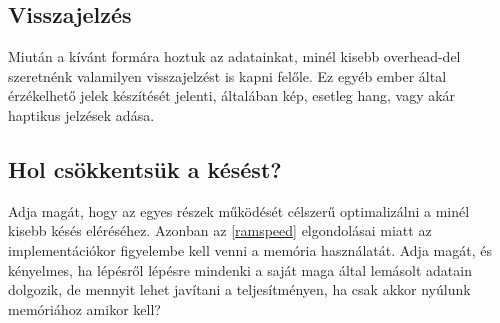 \subsection{Visszajelz\'es}
Miut\'an a k\'iv\'ant form\'ara hoztuk az adatainkat, min\'el kisebb overhead-del szeretn\'enk valamilyen visszajelz\'est is kapni fel\H ole. 
Ez egy\'eb ember \'altal \'erz\'ekelhet\H o jelek k\'esz\'it\'es\'et jelenti, \'altal\'aban k\'ep, esetleg hang, vagy ak\'ar haptikus jelz\'esek ad\'asa.
 
\subsection{Hol cs\"okkents\"uk a k\'es\'est?}
Adja mag\'at, hogy az egyes r\'eszek m\H uk\"od\'es\'et c\'elszer\H u optimaliz\'alni a min\'el kisebb k\'es\'es el\'er\'es\'ehez.
Azonban az \ref{ramspeed} elgondol\'asai miatt az implement\'aci\'okor figyelembe kell venni a mem\'oria haszn\'alat\'at. Adja mag\'at, \'es k\'enyelmes, ha l\'ep\'esr\H ol l\'ep\'esre mindenki a saj\'at maga \'altal lem\'asolt adatain dolgozik, de mennyit lehet jav\'itani a teljes\'itm\'enyen, ha csak akkor ny\'ulunk mem\'ori\'ahoz amikor kell?

